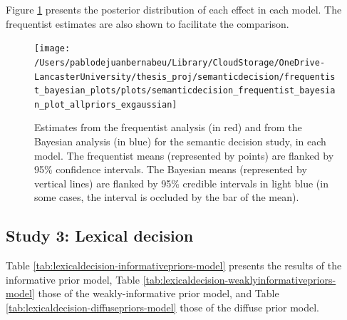 \documentclass[
  12pt,
  man,floatsintext]{apa7}
\begin{document}
\clearpage

Figure \ref{fig:semanticdecision-frequentist-bayesian-plot-allpriors-exgaussian} presents the posterior distribution of each effect in each model. The frequentist estimates are also shown to facilitate the comparison.

\begin{figure}

{\centering \texttt{[image: /Users/pablodejuanbernabeu/Library/CloudStorage/OneDrive-LancasterUniversity/thesis\_proj/semanticdecision/frequentist\_bayesian\_plots/plots/semanticdecision\_frequentist\_bayesian\_plot\_allpriors\_exgaussian]} 

}

\caption{Estimates from the frequentist analysis (in red) and from the Bayesian analysis (in blue) for the semantic decision study, in each model. The frequentist means (represented by points) are flanked by 95\% confidence intervals. The Bayesian means (represented by vertical lines) are flanked by 95\% credible intervals in light blue (in some cases, the interval is occluded by the bar of the mean).}\label{fig:semanticdecision-frequentist-bayesian-plot-allpriors-exgaussian}
\end{figure}

\clearpage

\hypertarget{study-3-lexical-decision-4}{%
\subsection{Study 3: Lexical decision}\label{study-3-lexical-decision-4}}

Table \ref{tab:lexicaldecision-informativepriors-model} presents the results of the informative prior model, Table \ref{tab:lexicaldecision-weaklyinformativepriors-model} those of the weakly-informative prior model, and Table \ref{tab:lexicaldecision-diffusepriors-model} those of the diffuse prior model.
\end{document}
